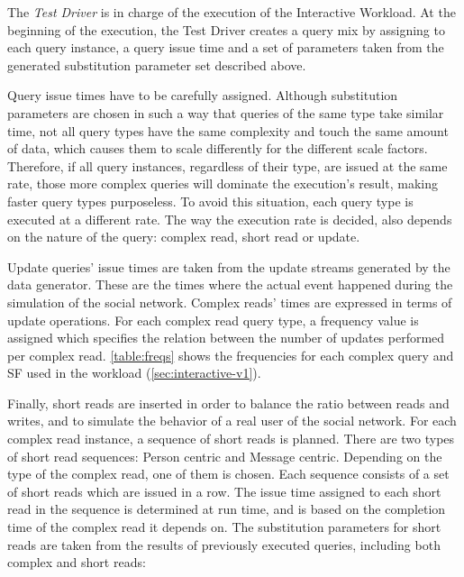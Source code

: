 The \emph{Test Driver} is in charge of the execution of the Interactive Workload.
At the beginning of the execution, the Test Driver creates a query mix by
assigning to each query instance, a query issue time and a set of parameters
taken from the generated substitution parameter set described above.  

Query issue times have to be carefully assigned. Although substitution
parameters are chosen in such a way that queries of the same type take similar
time, not all query types have the same complexity and touch the same amount of
data, which causes them to scale differently for the different scale factors.
Therefore, if all query instances, regardless of their type, are issued
at the same rate, those more complex queries will dominate the execution's
result, making faster query types purposeless. To avoid this situation, each
query type is executed at a different rate. The way the execution rate is decided,
also depends on the nature of the query: complex read, short read or update.

Update queries' issue times are taken from the update streams generated by the
data generator. These are the times where the actual event happened during the
simulation of the social network. Complex reads' times are expressed in terms
of update operations. For each complex read query type, a frequency value is
assigned which specifies the relation between the number of updates performed
per complex read. \autoref{table:freqs} shows the frequencies for each complex query and SF used in the \interactivevone workload (\autoref{sec:interactive-v1}).



Finally, short reads are inserted in order to balance the ratio between reads
and writes, and to simulate the behavior of a real user of the social network.
For each complex read instance, a sequence of short reads is planned. There are two
types of short read sequences: Person centric and Message centric. Depending on
the type of the complex read, one of them is chosen. Each sequence consists of
a set of short reads which are issued in a row. The issue time assigned to each
short read in the sequence is determined at run time, and is based on the
completion time of the complex read it depends on. 
The substitution parameters for short reads are taken from the results of previously
executed queries, including both complex and short reads:

